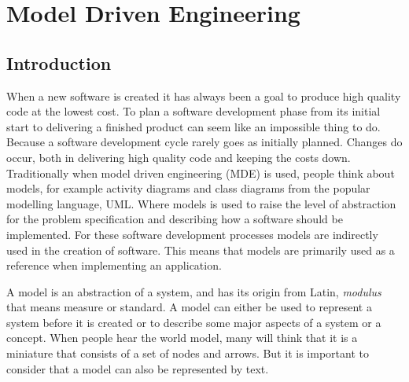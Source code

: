 
\chapter{Model Driven Engineering} %

\label{Chapter2} %



\section{Introduction}

When a new software is created it has always been a goal to produce high
quality code at the lowest cost. To plan a software development phase from its
initial start to delivering a finished product can seem like an impossible
thing to do. Because a software development cycle rarely goes as initially
planned. Changes do occur, both in delivering high quality code and keeping the
costs down. Traditionally when model driven engineering (MDE) is used, people
think about models, for example activity diagrams and class diagrams from the
popular modelling language, UML. Where models is used to raise the level
of abstraction for the problem specification and describing how a software
should be implemented. For these software development processes models are
indirectly used in the creation of software. This means that models are
primarily used as a reference when implementing an application.

A model is an abstraction of a system, and has its origin from Latin,
\textit{modulus} that means measure or standard. A model can either be used to
represent a system before it is created or to describe some major aspects of a
system or a concept. When people hear the world model, many will think that it
is a miniature that consists of a set of nodes and arrows. But it is important
to consider that a model can also be represented by text. 
 
